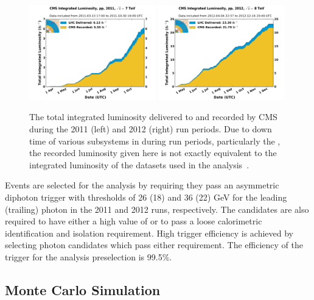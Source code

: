 \begin{figure}
  \includegraphics[width=0.49\textwidth]{analysis_comps/plots/int_lumi_2011.pdf}
  \includegraphics[width=0.49\textwidth]{analysis_comps/plots/int_lumi_2012.pdf}
  \caption[The total integrated luminosity delivered to and recorded by \acs{CMS} during the 2011 and 2012 run periods]{The total integrated luminosity delivered to and recorded by CMS during the 2011 (left) and 2012 (right) run periods. Due to down time of various subsystems in \CMS during run periods, particularly the \ECAL, the recorded luminosity given here is not exactly equivalent to the integrated luminosity of the datasets used in the analysis~\cite{lumi1,lumi2}.}
  \label{fig:intlumi}
\end{figure}

Events are selected for the analysis by requiring they pass an asymmetric diphoton trigger with \ET thresholds of 26 (18) and 36 (22) GeV for the leading (trailing) photon in the 2011 and 2012 runs, respectively. The candidates are also required to have either a high value of \rnine or to pass a loose calorimetric identification and isolation requirement. High trigger efficiency is achieved by selecting photon candidates which pass either requirement. The efficiency of the trigger for the analysis preselection is 99.5\%.

\subsection{Monte Carlo Simulation}
\label{sec:mc}

